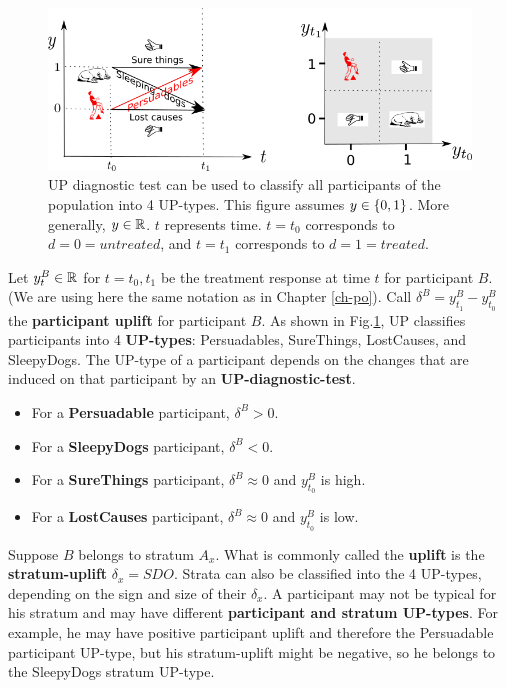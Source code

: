 \begin{figure}[h!]
\centering
\includegraphics[width=6in]
{uplift/uplift-y-t.png}
\caption{UP diagnostic test
can be used to classify
all participants of the
population into 4 UP-types.
This figure 
assumes $y\in \{0,1\}$.
More generally, $y\in { \mathbb{R}}$.
$t$ represents time. $t=t_0$
corresponds to $d=0=untreated$,
and $t=t_1$ corresponds to $d=1=treated$.} 
\label{fig-uplift-y-t}
\end{figure}

Let $y^B_t\in { \mathbb{R}}$ for $t=t_0, t_1$
be the treatment response at time $t$
for participant $B$. (We are using here
the same notation as in Chapter \ref{ch-po}).
Call $\delta^B=
y^B_{t_1}-y^B_{t_0}$ the {\bf participant uplift}
for participant $B$.
As shown
in Fig.\ref{fig-uplift-y-t},
UP classifies participants
into 4 {\bf UP-types}: Persuadables, SureThings, LostCauses,
and SleepyDogs.
The UP-type
of a participant
depends on the changes 
that are induced on that participant
by an {\bf UP-diagnostic-test}.
\begin{itemize}
\item
For a {\bf Persuadable} participant,
$\delta^B>0$.
\item
For a {\bf SleepyDogs}
participant, $\delta^B< 0$.
\item
For a {\bf SureThings} participant,
 $\delta^B\approx 0$
and $y^B_{t_0}$ is high.
\item
For a {\bf LostCauses} participant,
$\delta^B\approx 0$
and $y^B_{t_0}$ is low.
\end{itemize}


Suppose $B$
belongs to
stratum $A_x$.
What is commonly called 
the {\bf uplift} 
is the {\bf stratum-uplift} $\delta_x=SDO$.
Strata can also be
classified into
the 4 UP-types,
depending on the sign and size  
of their $\delta_x$.
A participant 
may not be typical for
his stratum
and may
have different
{\bf participant and stratum UP-types}.
For example, he may have positive 
participant uplift
and therefore the Persuadable participant UP-type,
but his stratum-uplift
might be negative, so
he belongs to
the SleepyDogs stratum UP-type.

